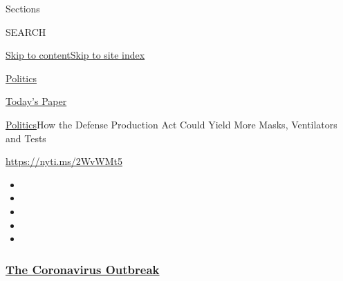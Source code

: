 Sections

SEARCH

\protect\hyperlink{site-content}{Skip to
content}\protect\hyperlink{site-index}{Skip to site index}

\href{https://www.nytimes3xbfgragh.onion/section/politics}{Politics}

\href{https://myaccount.nytimes3xbfgragh.onion/auth/login?response_type=cookie\&client_id=vi}{}

\href{https://www.nytimes3xbfgragh.onion/section/todayspaper}{Today's
Paper}

\href{/section/politics}{Politics}\textbar{}How the Defense Production
Act Could Yield More Masks, Ventilators and Tests

\url{https://nyti.ms/2WvWMt5}

\begin{itemize}
\item
\item
\item
\item
\item
\end{itemize}

\hypertarget{the-coronavirus-outbreak}{%
\subsubsection{\texorpdfstring{\href{https://www.nytimes3xbfgragh.onion/news-event/coronavirus?name=styln-coronavirus-national\&region=TOP_BANNER\&block=storyline_menu_recirc\&action=click\&pgtype=Article\&impression_id=432eef90-f2c5-11ea-9fa3-9f633d681c3c\&variant=undefined}{The
Coronavirus
Outbreak}}{The Coronavirus Outbreak}}\label{the-coronavirus-outbreak}}

